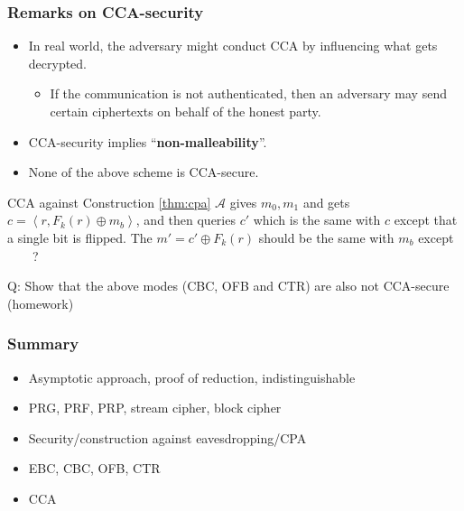 \begin{frame}\frametitle{Remarks on CCA-security}
\begin{itemize}
\item In real world, the adversary might conduct CCA by influencing what gets decrypted.
\begin{itemize}
\item If the communication is not authenticated, then an adversary may send certain ciphertexts on behalf of the honest party.
\end{itemize}
\item CCA-security implies ``\textbf{non-malleability}''.
\item None of the above scheme is CCA-secure. 
\end{itemize}
\begin{exampleblock}{CCA against Construction \ref{thm:cpa}}
$\mathcal{A}$ gives $m_{0}, m_{1}$ and gets $c = \left<r, F_k(r)\oplus m_{b}\right>$, 
and then queries $c'$ which is the same with $c$ except that a single bit is flipped. 
The $m' = c' \oplus F_k(r)$ should be the same with $m_{b}$ \alert{except \underline{$\qquad$}?}
\end{exampleblock}
\alert{Q: Show that the above modes (CBC, OFB and CTR) are also not CCA-secure (homework)}
\end{frame}
\begin{frame}\frametitle{Summary}
\begin{itemize}
\item Asymptotic approach, proof of reduction, indistinguishable
\item PRG, PRF, PRP, stream cipher, block cipher
\item Security/construction against eavesdropping/CPA
\item EBC, CBC, OFB, CTR
\item CCA
\end{itemize}
\end{frame}

